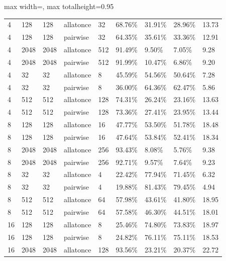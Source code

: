 \documentclass[11pt]{article}
\begin{document}
\begin{table}
\begin{adjustbox}{max width=\textwidth, max totalheight=0.95\textheight}
\begin{tabular}{lllllllll}
      4   & 128  & 128  & allatonce & 32   & 68.76\% & 31.91\%      & 28.96\%          & 13.73  \\
      4   & 128  & 128  & pairwise  & 32   & 64.35\% & 35.61\%      & 33.36\%          & 12.91  \\
      4   & 2048 & 2048 & allatonce & 512  & 91.49\% & 9.50\%       & 7.05\%           & 9.28   \\
      4   & 2048 & 2048 & pairwise  & 512  & 91.99\% & 10.47\%      & 6.86\%           & 9.20   \\
      4   & 32   & 32   & allatonce & 8    & 45.59\% & 54.56\%      & 50.64\%          & 7.28   \\
      4   & 32   & 32   & pairwise  & 8    & 36.00\% & 64.36\%      & 62.47\%          & 5.86   \\
      4   & 512  & 512  & allatonce & 128  & 74.31\% & 26.24\%      & 23.16\%          & 13.63  \\
      4   & 512  & 512  & pairwise  & 128  & 73.36\% & 27.41\%      & 23.95\%          & 13.44  \\
      8   & 128  & 128  & allatonce & 16   & 47.77\% & 53.50\%      & 51.78\%          & 18.48  \\
      8   & 128  & 128  & pairwise  & 16   & 47.64\% & 53.84\%      & 52.41\%          & 18.34  \\
      8   & 2048 & 2048 & allatonce & 256  & 93.43\% & 8.08\%       & 5.76\%           & 9.38   \\
      8   & 2048 & 2048 & pairwise  & 256  & 92.71\% & 9.57\%       & 7.64\%           & 9.23   \\
      8   & 32   & 32   & allatonce & 4    & 22.42\% & 77.94\%      & 71.45\%          & 6.32   \\
      8   & 32   & 32   & pairwise  & 4    & 19.88\% & 81.43\%      & 79.45\%          & 4.94   \\
      8   & 512  & 512  & allatonce & 64   & 57.98\% & 43.61\%      & 41.80\%          & 18.95  \\
      8   & 512  & 512  & pairwise  & 64   & 57.58\% & 46.30\%      & 44.51\%          & 18.01  \\
      16  & 128  & 128  & allatonce & 8    & 25.46\% & 74.80\%      & 73.83\%          & 18.97  \\
      16  & 128  & 128  & pairwise  & 8    & 24.82\% & 76.11\%      & 75.11\%          & 18.53  \\
      16  & 2048 & 2048 & allatonce & 128  & 93.56\% & 23.21\%      & 20.37\%          & 22.72  \\

\end{tabular}
\end{adjustbox}
\end{table}
\end{document}
